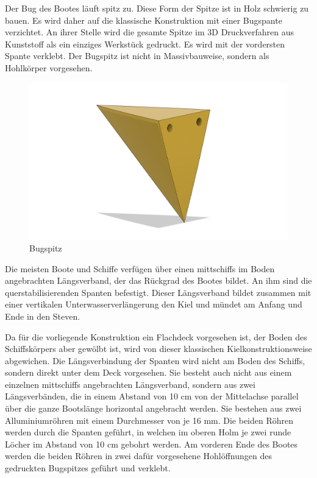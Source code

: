 Der Bug des Bootes läuft spitz zu. Diese Form der Spitze ist in Holz schwierig zu bauen. Es wird daher auf die klassische Konstruktion mit einer Bugspante verzichtet. An ihrer Stelle wird die gesamte Spitze im 3D Druckverfahren aus Kunststoff als ein einziges Werkstück gedruckt. Es wird mit der vordersten Spante verklebt. Der Bugspitz ist nicht in Massivbauweise, sondern als Hohlkörper vorgesehen.
\begin{figure}[H]
    \centering
    \includegraphics[width=0.8\linewidth]{assets/bug_spitz.png}
 \caption{Bugspitz}
    
\end{figure}
Die meisten Boote und Schiffe verfügen über einen mittschiffs im Boden angebrachten Längsverband, der das Rückgrad des Bootes bildet. An ihm sind die querstabilisierenden Spanten befestigt. Dieser Längsverband bildet zusammen mit einer vertikalen Unterwasserverlängerung den Kiel und mündet am Anfang und Ende in den Steven. 

Da für die vorliegende Konstruktion ein Flachdeck vorgesehen ist, der Boden des Schiffskörpers aber gewölbt ist, wird von dieser klassischen Kielkonstruktionsweise abgewichen. Die Längsverbindung der Spanten wird nicht am Boden des Schiffs, sondern direkt unter dem Deck vorgesehen. Sie besteht auch nicht aus einem einzelnen mittschiffs angebrachten Längsverband, sondern aus zwei Längsverbänden, die in einem Abstand von 10 cm von der Mittelachse parallel über die ganze Bootslänge horizontal angebracht werden. Sie bestehen aus zwei Alluminiumröhren mit einem Durchmesser von je 16 mm. Die beiden Röhren werden durch die Spanten geführt, in welchen im oberen Holm je zwei runde Löcher im Abstand von 10 cm gebohrt werden. Am vorderen Ende des Bootes werden die beiden Röhren in zwei dafür vorgesehene Hohlöffnungen des gedruckten Bugspitzes geführt und verklebt.

